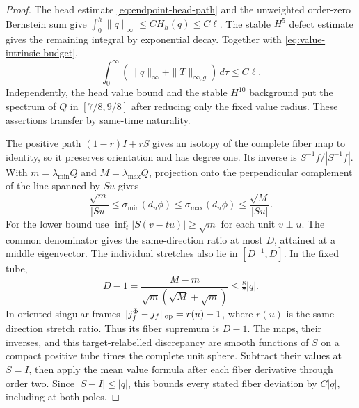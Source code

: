 \documentclass[11pt]{article}
\numberwithin{equation}{section}
\theoremstyle{definition}
\theoremstyle{remark}
\begin{document}
\begin{proof}
The head estimate \eqref{eq:endpoint-head-path} and
the unweighted order-zero Bernstein sum give
\(\int_0^h\|q\|_\infty\le CH_h(q)\le C\ell\).
The stable \(H^5\) defect estimate gives the remaining
integral by exponential decay. Together with
\eqref{eq:value-intrinsic-budget},
\[
 \int_0^\infty(\|q\|_\infty+\|T\|_{\infty,g})\,d\tau\le C\ell .
\]
Independently, the head value bound and the stable
\(H^{10}\) background put the spectrum of \(Q\) in
\([7/8,9/8]\) after reducing only the fixed value radius.
These assertions transfer by same-time naturality.

The positive path \((1-r)I+rS\) gives an isotopy of
the complete fiber map to identity, so it preserves
orientation and has degree one. Its inverse is
\(S^{-1}f/|S^{-1}f|\). With \(m=\lambda_{\min}Q\)
and \(M=\lambda_{\max}Q\), projection onto the
perpendicular complement of the line spanned by \(Su\) gives
\[
 \frac{\sqrt m}{|Su|}\le\sigma_{\min}(d_u\phi)
 \le\sigma_{\max}(d_u\phi)\le\frac{\sqrt M}{|Su|}.
\]
For the lower bound use \(\inf_t|S(v-tu)|\ge\sqrt m\)
for each unit \(v\perp u\). The common denominator gives
the same-direction ratio at most \(D\), attained at a
middle eigenvector. The individual stretches also lie
in \([D^{-1},D]\).
In the fixed tube,
\[
 D-1=\frac{M-m}{\sqrt m(\sqrt M+\sqrt m)}
                                      \le\tfrac87|q|.
\]
In oriented singular frames
\(\|j^\Phi_f-j_f\|_{\rm op}=r(u)-1\), where \(r(u)\)
is the same-direction stretch ratio. Thus its fiber
supremum is \(D-1\). The maps, their inverses,
and this target-relabelled discrepancy are smooth
functions of \(S\) on a compact positive tube times
the complete unit sphere. Subtract their values at
\(S=I\), then apply the mean value formula after each
fiber derivative through order two. Since
\(|S-I|\le|q|\), this bounds every stated fiber
deviation by \(C|q|\), including at both poles.


\end{proof}
\end{document}
